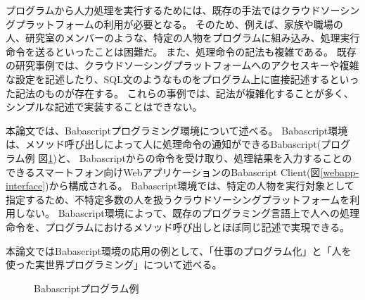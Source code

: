 \documentclass[twoside]{wiss}
\begin{document}
プログラムから人力処理を実行するためには、既存の手法ではクラウドソーシングプラットフォームの利用が必要となる。
そのため、例えば、家族や職場の人、研究室のメンバーのような、特定の人物をプログラムに組み込み、処理実行命令を送るといったことは困難だ。
また、処理命令の記法も複雑である。
既存の研究事例では、クラウドソーシングプラットフォームへのアクセスキーや複雑な設定を記述したり、SQL文のようなものをプログラム上に直接記述するといった記法のものが存在する。
これらの事例では、記法が複雑化することが多く、シンプルな記述で実装することはできない。

本論文では、Babascriptプログラミング環境について述べる。
Babascript環境は、メソッド呼び出しによって人に処理命令の通知ができるBabascript(プログラム例 図\ref{script_01})と、
Babascriptからの命令を受け取り、処理結果を入力することのできるスマートフォン向けWebアプリケーションのBabascript Client(図\ref{webapp-interface})から構成される。
Babascript環境では、特定の人物を実行対象として指定するため、不特定多数の人を扱うクラウドソーシングプラットフォームを利用しない。
Babascript環境によって、既存のプログラミング言語上で人への処理命令を、プログラムにおけるメソッド呼び出しとほぼ同じ記述で実現できる。

本論文ではBabascript環境の応用の例として、「仕事のプログラム化」と「人を使った実世界プログラミング」について述べる。


\begin{figure}[!h]  
  \centering
  \caption{Babascriptプログラム例}
  \label{script_01}
\end{figure}
\end{document}
